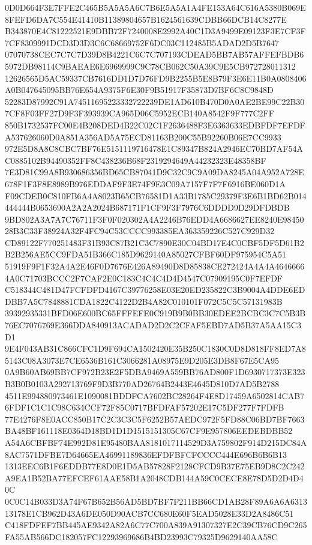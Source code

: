 \documentclass[UTF8,fontset=fandol,zihao=-4,a4paper]{ctexart}
\begin{document}
{{0D0D664F3E7FFE2C465B5A5A5A6C7B6E5A5A1A4FE153A64C616A5380B069E8FEFD6DA7C554E41410B11389804657B1624561639CDBB66DCB14C8277E
B343870E4C81222521E9DBB72F7240008E2992A40C1D3A9499E09123F3E7CF3F7CF8309991DCD3D3D3C6C68669752F6DC03C112485B5ADAD2D5B7647
07070738CEC7C7C7D39D8B4221C6C7C707193CDEAD5BB7AB57AFFEFBDB65972DB98114C9BAEAE6E6969999C9C78CB062C50A39C9E5CB972728011312
12626565D5AC59337CB7616DD1D7D76FD9B2255B5E8B79F3E6E11B0A0808406A0B047645095BB76E654A9375F6E30F9B51917F35873D7BF6C8C9848D
52283D87992C91A74511695223332722239DE1AD610B470D0A0AE2BE99C22B307CF8F03FF27D9F3F393939CA965D06C5952ECB140A8542F9F777C2FF
850B1732537FC00E4B208DED4B22C02C1F2636488F3E6363633EDBFDF7EFDFA537626060D0A851A356AD5A75ECD81163B200C55B92260B06E7CC9933
972E5D8A8C8CBC7BF76E5151119716478E1C89347B824A2946EC70BD7AF54AC0885102B94490352FF8C438236B68F2319294649A44232323E48358BF
7E3D81C99A8B930686356BD65CB87041D9C32C9C9A09DA8245A04A952A728E678F1F3F8E8989B976EDDAF9F3E74F9E3C09A7157F7F7F6916BE060D1A
F09CDEB0C810FB6A4A8023B65CB76581D1A33B1785C29379F3E6B1BD62B014444444B0653690A2A2A2024B687171F1CF9F3F7976C6DDDD9D29DFDBDB
9BD802A3A7A7C76711F3F0F020302A4A2246B76EDD4A6686627EE8240E9845028B3C33F38924A32F4FC94C53CCCC993385EA363359226C527C929D32
CD89122F770251483F31B93C87B21C3C7890E30C04BD17E4C0CBF5DF5D61B2B2B256AE5CC9FDA51B366C185D9629140A85027CFBF60DF975954C5A51
51919F9F1F32A4A2E46F0D7676E426A89490D8D85838CE272424A4A4A46466664A0C71703BCCC2F7CAF2E0C183C4C4C4D4D4547C07909195C0F7EFDF
C518344C481D47FCFDFD4167C39776258E03E20ED235822C3B9004A4DDE6EDDBB7A5C7848881CDA1822C4122D2B4A82C010101F072C5C5C57131983B
39392935331BFD06E600BC65FFFEFE0C919B9B0BB30EDEE2BCBC3C7C5B3B76EC7076769E366DDA840913ACADAD2D2C2CFAF5EBD7AD5B37A5AA15C3D1
9E4F043AB31C866CFC1D9F694CA1502420E35B250C1830C0D8D818FF8ED7A85143C08A3073E7CE6536B161C3066281A08975E9D205E3DB8F67E5CA95
0A9B60AB69BB7CF972B23E2F5DBA9469A559BB76AD800F1D6930717373E323B3B0B0103A292713769F9D3B770AD26764B2443E4645D810D7AD5B2788
4511E994880973461E1090081BDDFCA7602BC28264F4E8D17459A6502814CAB76FDF1C1C1C98C634CCF72F85C0717BFDFAF57202E17C5DF277F7FDFB
77E4276F8E0ACC850B17C2C3C3C5F6252B57AEDC972F5FD88C06BD7BF7663BA48BF161118E0364D18BD1D1D1515151305C67CF9E957806EEDEBDBB52
A54A6CBFBF74E992D81E95480BAA8181017114529D3A759802F914D215DC84A8AC7571DFBE7D64665EA46991189836EFDFBFCFCCCC444E696B6B6B13
1313EEC6B1F6EDDB77E8D0E1D5AB57828F2128CFCD9B37E75EB9D8C2C242A9EA1B52BA77EFCEF61AAE58B1A2048CDB144A59C0CECE8E78D5D2D4D40C
0C0C14B033D3A74F67B652B56AD5BD7BF7F211BB66CD1AB28F89A6A6A631313178E1CB962D43A6DE050D90ACB7CC680E60F5EAD5028E33D2A8486C51
C418FDFEF7BB445AE9342A82A6C77C700A839A91307327E2C39CB76CD9C265FA55AB566DC182057FC12293969686B4BD23993C79325D9629140AA58C
}}
\end{document}
